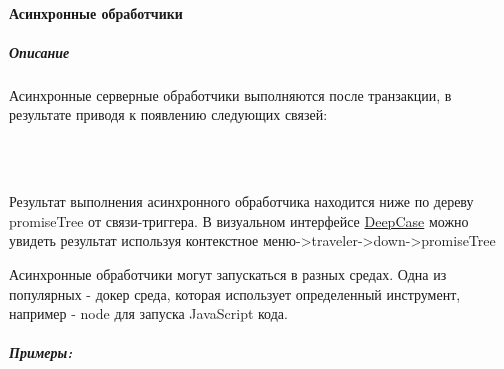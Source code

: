 \documentclass{article}
\begin{document}
\paragraph{Асинхронные обработчики}
\subparagraph{Описание}
Асинхронные серверные обработчики выполняются после транзакции, в результате
приводя к появлению следующих связей: \\
\newenvironment{handler_success_result_info}
{%
  \noindent При успешном выполнении: Связь\textendash триггер \textendash
  Then\textendash > Promise \textendash Resolved\textendash > \\
  PromiseResult {(с object value)}
}
{}
\newenvironment{handler_fail_result_info}
{%
  При ошибке: Связь\textendash триггер \textendash Then\textendash > Promise
  \textendash Rejected\textendash > PromiseResult {(с object value)}
}
{}
\begin{handler_success_result_info}
\end{handler_success_result_info}\\
\begin{handler_fail_result_info}
\end{handler_fail_result_info}\\
Результат выполнения асинхронного обработчика находится ниже по дереву
promiseTree от связи-триггера. В визуальном интерфейсе
\hyperlink{DeepCase.Description}{DeepCase} можно увидеть
результат используя контекстное меню->traveler->down->promiseTree

Асинхронные обработчики могут запускаться в разных средах. Одна из популярных -
докер среда, которая использует определенный инструмент, например - node для
запуска JavaScript кода.
\subparagraph{Примеры:}
\end{document}

